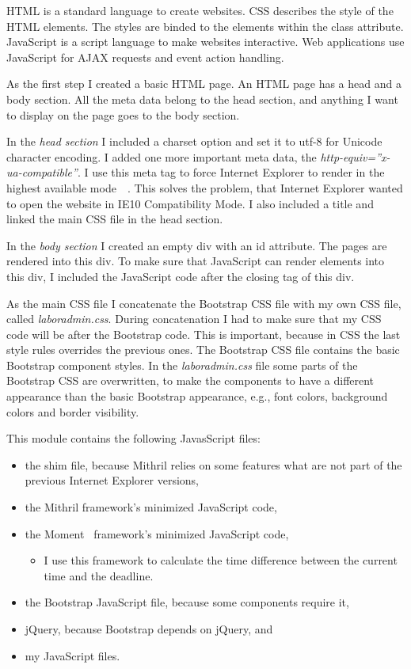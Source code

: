 HTML is a standard language to create websites. CSS describes the style of the HTML elements. The styles are binded to the elements within the class attribute. JavaScript is a script language to make websites interactive. Web applications use JavaScript for AJAX requests and event action handling. 

As the first step I created a basic HTML page. An HTML page has a head and a body section. All the meta data belong to the head section, and anything I want to display on the page goes to the body section. \label{html-impl}

In the \emph{head section} I included a charset option and set it to utf-8 for Unicode character encoding. I added one more important meta data, the \emph{http-equiv=''x-ua-compatible''}. I use this meta tag to force Internet Explorer to render in the highest available mode~\cite{IE10-microsoft}~\cite{IE10-html5-boiler}. This solves the problem, that Internet Explorer wanted to open the website in IE10 Compatibility Mode. I also included a title and linked the main CSS file in the head section.

In the \emph{body section} I created an empty div with an id attribute. The pages are rendered into this div. To make sure that JavaScript can render elements into this div, I included the JavaScript code after the closing tag of this div.

As the main CSS file I concatenate the Bootstrap CSS file with my own CSS file, called \mbox{\emph{laboradmin.css}}. During concatenation I had to make sure that my CSS code will be after the Bootstrap code. This is important, because in CSS the last style rules overrides the previous ones. The Bootstrap CSS file contains the basic Bootstrap component styles. In the \mbox{\emph{laboradmin.css}} file some parts of the Bootstrap CSS are overwritten, to make the components to have a different appearance than the basic Bootstrap appearance, e.g., font colors, background colors and border visibility.

This module contains the following JavasScript files: 
\begin{itemize}
	\item the shim file, because Mithril relies on some features what are not part of the previous Internet Explorer versions,
	\item the Mithril framework's minimized JavaScript code,
	\item the Moment~\cite{moment} framework's minimized JavaScript code,
	\begin{itemize}
		\item I use this framework to calculate the time difference between the current time and the deadline.
	\end{itemize}
	\item the Bootstrap JavaScript file, because some components require it,
	\item jQuery, because Bootstrap depends on jQuery, and
	\item my JavaScript files.
\end{itemize}

